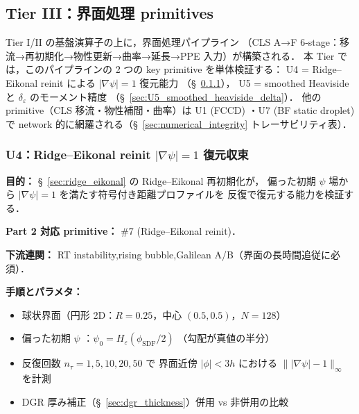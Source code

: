 %
\subsection{Tier III：界面処理 primitives}
\label{sec:verify_interface}

Tier I/II の基盤演算子の上に，界面処理パイプライン
（CLS A→F 6-stage：移流→再初期化→物性更新→曲率→延長→PPE 入力）が構築される．
本 Tier では，このパイプラインの 2 つの key primitive を単体検証する：
U4 = Ridge--Eikonal reinit による $|\nabla\psi| = 1$ 復元能力
（§~\ref{sec:U4_ridge_eikonal_reinit}），
U5 = smoothed Heaviside と $\delta_\varepsilon$ のモーメント精度
（§~\ref{sec:U5_smoothed_heaviside_delta}）．
他の primitive（CLS 移流・物性補間・曲率）は U1 (FCCD) ・U7 (BF static droplet) で
network 的に網羅される（§~\ref{sec:numerical_integrity} トレーサビリティ表）．

\subsubsection{U4：Ridge--Eikonal reinit $|\nabla\psi| = 1$ 復元収束}
\label{sec:U4_ridge_eikonal_reinit}

\noindent\textbf{目的：}
§~\ref{sec:ridge_eikonal} の Ridge--Eikonal 再初期化が，
偏った初期 $\psi$ 場から $|\nabla\psi| = 1$ を満たす符号付き距離プロファイルを
反復で復元する能力を検証する．

\noindent\textbf{Part 2 対応 primitive：} \#7 (Ridge--Eikonal reinit)．

\noindent\textbf{下流連関：}
RT instability,rising bubble,Galilean A/B（界面の長時間追従に必須）．

\noindent\textbf{手順とパラメタ：}
\begin{itemize}[noitemsep]
  \item 球状界面（円形 2D：$R = 0.25$，中心 $(0.5, 0.5)$，$N = 128$）
  \item 偏った初期 $\psi$ ：$\psi_0 = H_\varepsilon(\phi_{\mathrm{SDF}}/2)$
        （勾配が真値の半分）
  \item 反復回数 $n_\tau = 1, 5, 10, 20, 50$ で
        界面近傍 $|\phi| < 3h$ における $\||\nabla\psi| - 1\|_\infty$ を計測
  \item DGR 厚み補正（§~\ref{sec:dgr_thickness}）併用 vs 非併用の比較
\end{itemize}

